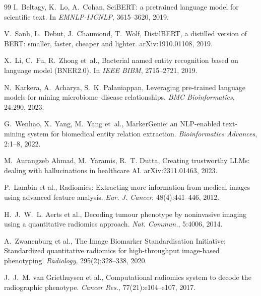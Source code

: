\documentclass[10pt,twocolumn,letterpaper]{article}
\begin{document}
\begin{thebibliography}{99}
I.~Beltagy, K.~Lo, A.~Cohan,
\newblock SciBERT: a pretrained language model for scientific text.
\newblock In \emph{EMNLP-IJCNLP}, 3615--3620, 2019.

V.~Sanh, L.~Debut, J.~Chaumond, T.~Wolf,
\newblock DistilBERT, a distilled version of BERT: smaller, faster, cheaper
and lighter.
\newblock arXiv:1910.01108, 2019.

X.~Li, C.~Fu, R.~Zhong et~al.,
\newblock Bacterial named entity recognition based on language model
(BNER2.0).
\newblock In \emph{IEEE BIBM}, 2715--2721, 2019.

N.~Karkera, A.~Acharya, S.~K. Palaniappan,
\newblock Leveraging pre-trained language models for mining
microbiome--disease relationships.
\newblock \emph{BMC Bioinformatics}, 24:290, 2023.

G.~Wenhao, X.~Yang, M.~Yang et~al.,
\newblock MarkerGenie: an NLP-enabled text-mining system for biomedical
entity relation extraction.
\newblock \emph{Bioinformatics Advances}, 2:1--8, 2022.

M.~Aurangzeb Ahmad, M.~Yaramis, R.~T. Dutta,
\newblock Creating trustworthy LLMs: dealing with hallucinations in
healthcare AI.
\newblock arXiv:2311.01463, 2023.


P.~Lambin et al.,
\newblock Radiomics: Extracting more information from medical images using
advanced feature analysis.
\newblock \emph{Eur. J. Cancer}, 48(4):441--446, 2012.

H.~J.~W.~L. Aerts et al.,
\newblock Decoding tumour phenotype by noninvasive imaging using a
quantitative radiomics approach.
\newblock \emph{Nat. Commun.}, 5:4006, 2014.

A.~Zwanenburg et al.,
\newblock The Image Biomarker Standardisation Initiative: Standardized
quantitative radiomics for high-throughput image-based phenotyping.
\newblock \emph{Radiology}, 295(2):328--338, 2020.

J.~J.~M. van Griethuysen et al.,
\newblock Computational radiomics system to decode the radiographic
phenotype.
\newblock \emph{Cancer Res.}, 77(21):e104--e107, 2017.


\end{thebibliography}
\end{document}
